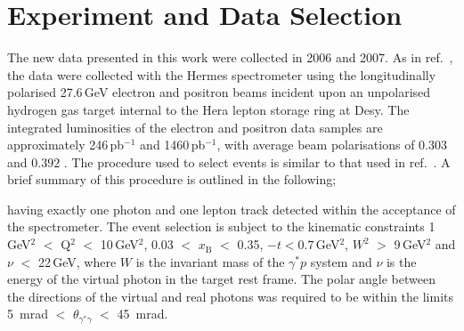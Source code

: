 \section{Experiment and Data Selection}
The new data presented in this work were collected in 2006 and 2007. As in ref.~\cite{Air09}, the data were collected with the H{\sc ermes}
spectrometer \cite{Ack98} using the longitudinally polarised 27.6\,GeV
electron and positron beams incident upon an unpolarised hydrogen gas
target internal to the H{\sc era} lepton storage ring at D{\sc esy}. The integrated luminosities of the electron and positron data samples are
approximately 246\,pb$^{-1}$ and 1460\,pb$^{-1}$, with average beam polarisations of $0.303$ and $0.392$ . The procedure used to select events is similar to that used in ref.~\cite{Air09}. A brief summary of this procedure is outlined in the following;  

 having exactly one photon and one lepton
track detected within the acceptance of the spectrometer.
The event selection is subject to the kinematic constraints 1\,GeV$^{2}$ $<$
Q$^{2}$ $<$ 10\,GeV$^{2}$, 0.03 $<$ $x_{\textrm{B}}$ $<$ 0.35,
$-t < 0.7$\,GeV$^2$, $W^{2}$ $>$
9\,GeV$^{2}$ and $\nu$ $<$ 22\,GeV, where $W$ is the invariant mass of the
$\gamma^{*}p$ system and $\nu$ is the energy of the virtual photon in the target
rest frame. The polar angle between the directions of the virtual and real photons was required to
be within the limits 5~mrad $<$
$\theta_{\gamma^{*}\gamma}$ $<$ 45~mrad. 

